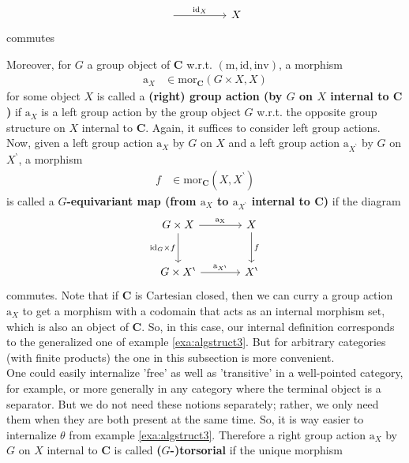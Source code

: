\begin{exa}
\begin{enumerate}
\begin{enumerate}
\[\begin{tikzcd}[sep=normal]
  \arrow{rr}{\mathrm{id}_{X}}
  &
  &
  X
\end{tikzcd}
\]
commutes
\end{enumerate}
Moreover, for $G$ a group object of $\mathbf{C}$ w.r.t. $(\mathrm{m},\mathrm{id},\mathrm{inv})$, a morphism
\begin{align*}
  \mathrm{a}_{X}
  &\in
  \mathrm{mor}_{\mathbf{C}}
  \left(
    G
    \times
    X,
    X
  \right)
\end{align*}
for some object $X$ is called a \textbf{(right) group action (by $G$ on $X$ internal to $\mathbf{C}$)} if $\mathrm{a}_{X}$ is a left group action by the group object $G$ w.r.t. the opposite group structure on $X$ internal to $\mathbf{C}$.
Again, it suffices to consider left group actions.
Now, given a left group action $\mathrm{a}_{X}$ by $G$ on $X$ and a left group action $\mathrm{a}_{X^{\backprime}}$ by $G$ on $X^{\backprime}$, a morphism
\begin{align*}
  f
  &\in
  \mathrm{mor}_{\mathbf{C}}
  \left(
    X,
    X^{\backprime}
  \right)
\end{align*}
is called a \textbf{$G$-equivariant map (from $\mathrm{a}_{X}$ to $\mathrm{a}_{X^{\backprime}}$ internal to $\mathbf{C}$)} if the diagram
\[
\begin{tikzcd}[sep=large]
  G
  \times
  X
  \arrow{r}{\mathrm{a_{X}}}
  \arrow[swap]{d}{\mathrm{id}_{G} \times f}
  &
  X
  \arrow{d}{f}
  \\
  G
  \times
  X^{\backprime}
  \arrow{r}{\mathrm{a}_{X^{\backprime}}}
  &
  X^{\backprime}
\end{tikzcd}
\]
commutes.
Note that if $\mathbf{C}$ is Cartesian closed, then we can curry a group action $\mathrm{a}_{X}$ to get a morphism with a codomain that acts as an {\glqq}internal morphism set{\grqq}, which is also an object of $\mathbf{C}$.
So, in this case, our internal definition corresponds to the generalized one of example \ref{exa:algstruct3}.
But for arbitrary categories (with finite products) the one in this subsection is more convenient.
\\
One could easily internalize 'free' as well as 'transitive' in a well-pointed category, for example, or more generally in any category where the terminal object is a separator.
But we do not need these notions separately; rather, we only need them when they are both present at the same time.
So, it is way easier to internalize $\theta$ from example \ref{exa:algstruct3}.
Therefore a right group action $\mathrm{a}_{X}$ by $G$ on $X$ internal to $\mathbf{C}$ is called \textbf{($G$-)torsorial} if the unique morphism

\end{enumerate}
\end{exa}
